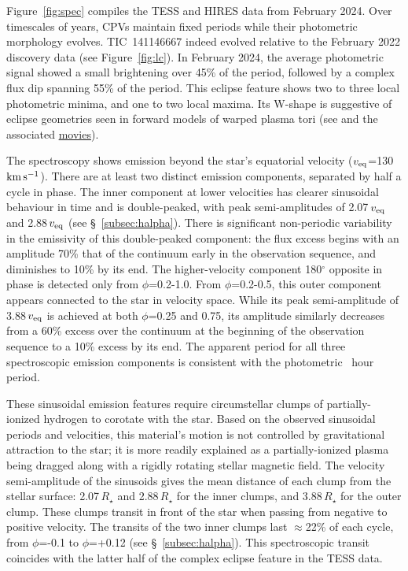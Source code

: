 \documentclass{nature3}
\newcommand{\kms}{\ensuremath{\rm km\,s^{-1}}}
\begin{document}
Figure~\ref{fig:spec} compiles the TESS and HIRES data from February
2024.  Over timescales of years, CPVs maintain fixed periods while
their photometric morphology evolves.  TIC~141146667 indeed evolved
relative to the February 2022 discovery data (see Figure~\ref{fig:lc}).
In February 2024, the average photometric signal showed a small
brightening over 45\% of the period, followed by a complex flux dip
spanning 55\% of the period.  This eclipse feature shows two to three
local photometric minima, and one to two local maxima.  Its W-shape is
suggestive of eclipse geometries seen in forward models of warped
plasma tori (see \cite{Townsend2008} and the associated
\href{http://user.astro.wisc.edu/~townsend/static.php?ref=rrm-movies#Download_Bundles}{movies}).

The spectroscopy shows emission beyond the star's equatorial velocity
($v_{\rm eq}$=130\,\kms).  There are at least two distinct emission
components, separated by half a cycle in phase.  The inner component
at lower velocities has clearer sinusoidal behaviour in time and is
double-peaked, with peak semi-amplitudes of 2.07\,$v_{\rm eq}$ and
2.88\,$v_{\rm eq}$ (see \S~\ref{subsec:halpha}).  There is significant
non-periodic variability in the emissivity of this double-peaked
component: the flux excess begins with an amplitude 70\% that of the
continuum early in the observation sequence, and diminishes to 10\% by
its end.  The higher-velocity component 180$^\circ$ opposite in phase
is detected only from $\phi$=0.2-1.0.  From $\phi$=0.2-0.5, this outer
component appears connected to the star in velocity space.  While its
peak semi-amplitude of 3.88\,$v_{\rm eq}$ is achieved at both
$\phi$=0.25 and 0.75, its amplitude similarly decreases from a 60\%
excess over the continuum at the beginning of the observation sequence
to a 10\% excess by its end.  The apparent period for all three
spectroscopic emission components is consistent with the photometric
\periodhr\ hour period.  

These sinusoidal emission features require circumstellar clumps of
partially-ionized hydrogen to corotate with the star.  Based on the
observed sinusoidal periods and velocities, this material's motion is
not controlled by gravitational attraction to the star; it is more
readily explained as a partially-ionized plasma being dragged along
with a rigidly rotating stellar magnetic field.  The velocity
semi-amplitude of the sinusoids gives the mean distance of each clump
from the stellar surface: 2.07\,$R_\star$ and 2.88\,$R_\star$ for the
inner clumps, and 3.88\,$R_\star$ for the outer clump.   These clumps
transit in front of the star when passing from negative to positive
velocity.  The transits of the two inner clumps last $\approx$22\% of
each cycle, from $\phi$=-0.1 to $\phi$=+0.12 (see
\S~\ref{subsec:halpha}).  This spectroscopic transit coincides with
the latter half of the complex eclipse feature in the TESS data.
\end{document}
